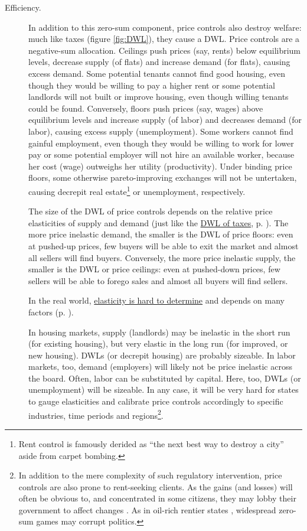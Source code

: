 \begin{description}
	\item[Efficiency.] 
		In addition to this zero-sum component, price controls also destroy welfare: much like taxes (figure \ref{fig:DWL}), they cause a \gls{DWL}.  Price controls are a negative-sum allocation. Ceilings push prices (say, rents) below equilibrium levels, decrease supply (of flats) and increase demand (for flats), causing excess demand. Some potential tenants cannot find good housing, even though they would be willing to pay a higher rent or some potential landlords will not built or improve housing, even though willing tenants could be found. Conversely, floors push prices (say, wages) above equilibrium levels and increase supply (of labor) and decreases demand (for labor), causing excess supply (unemployment). Some workers cannot find gainful employment, even though they would be willing to work for lower pay or some potential employer will not hire an available worker, because her cost (wage) outweighs her utility (productivity). Under binding price floors, some otherwise pareto-improving exchanges will not be untertaken, causing decrepit real estate\footnote{
			Rent control is famously derided as ``the next best way to destroy a city'' aside from carpet bombing.} 
		or unemployment, respectively. 
	
		The size of the \gls{DWL} of price controls depends on the relative price elasticities of supply and demand (just like the \hyperref[sec:minimal_DWL]{\gls{DWL} of taxes}, p. \pageref{sec:minimal_DWL}).
		The more price inelastic demand, the smaller is the \gls{DWL} of price floors: even at pushed-up prices, few buyers will be able to exit the market and almost all sellers will find buyers. Conversely, the more price inelastic supply, the smaller is the \gls{DWL} or price ceilings: even at pushed-down prices, few sellers will be able to forego sales and almost all buyers will find sellers. 
	
		In the real world, \hyperref[sec:well-determined_incidence]{elasticity is hard to determine} and depends on many factors (p. \pageref{sec:well-determined_incidence}). 
	
		In housing markets, supply (landlords) may be inelastic in the short run (for existing housing), but very elastic in the long run (for improved, or new housing). \glspl{DWL} (or decrepit housing) are probably sizeable. In labor markets, too, demand (employers) will likely not be price inelastic across the board. Often, labor can be substituted by capital. Here, too, \glspl{DWL} (or unemployment) will be sizeable. In any case, it will be very hard for states to gauge elasticities and calibrate price controls accordingly to specific industries, time periods and regions\footnote{
			In addition to the mere complexity of such regulatory intervention, price controls are also prone to rent-seeking clients. As the gains (and losses) will often be obvious to, and concentrated in some citizens, they may lobby their government to affect changes \citep{Peltzman1976,Posner1975,Krueger1974}. As in oil-rich rentier states \citep{Beblawi1990}, widespread zero-sum games may corrupt politics.}.
		

\end{description}
